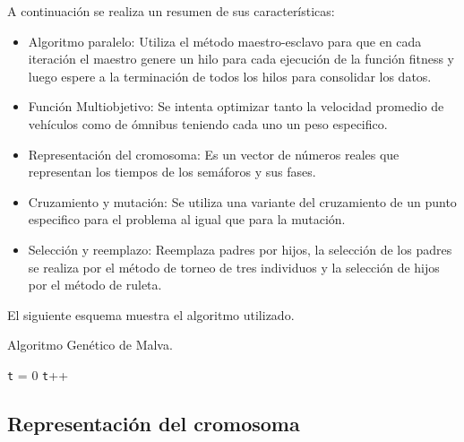 A continuación se realiza un resumen de sus características:
\begin{itemize}

\item Algoritmo paralelo: Utiliza el método maestro-esclavo para que en cada iteración el maestro genere un hilo para cada ejecución  de la función fitness y luego espere a la terminación de todos los hilos para consolidar los datos. 
\item Función Multiobjetivo: Se intenta optimizar tanto la velocidad promedio de vehículos como de ómnibus teniendo cada uno un peso especifico.
\item Representación del cromosoma: Es un vector de números reales que representan los tiempos de los semáforos y sus fases.
\item Cruzamiento y mutación: Se utiliza una variante del cruzamiento de un punto especifico para el problema al igual que para la mutación.
\item Selección y reemplazo: Reemplaza padres por hijos, la selección de los padres se realiza por el método de torneo de tres individuos y la selección de hijos por el método de ruleta.

\end{itemize}


El siguiente esquema muestra el algoritmo utilizado. 
 
\begin{algorithm}[H]
	\caption{Algoritmo Genético de Malva. }
	\label{alg:algoritmo_genetico_malva}
	\begin{algorithmic} [1] 
		{
			\STATE \texttt{t} = 0
			\STATE \texttt{t}++		
			\ENDWHILE
		}
	\end{algorithmic}

\end{algorithm}




 

\subsection{Representación del cromosoma}

